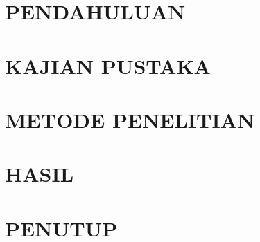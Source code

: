 



\newpage


\newpage
\frontmatter


%

%





\newpage
\tableofcontents

\newpage
\listoffigures

\newpage
\listoftables

\newpage
\mainmatter

\chapter{PENDAHULUAN}







\chapter{KAJIAN PUSTAKA}



\chapter{METODE PENELITIAN}



\chapter{HASIL}

%
%

\chapter{PENUTUP}

\newpage






